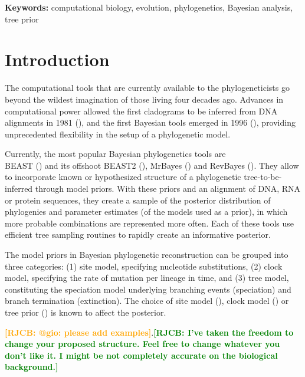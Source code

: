 \documentclass{article}
\newcommand*\richel[1]{\textcolor{orange}{\textbf{[RJCB: #1]}}}
\newcommand*\gio[1]{\textcolor{green}{\textbf{[RJCB: #1]}}}
\begin{document}
{\bf Keywords:} computational biology, evolution, phylogenetics, Bayesian analysis, tree prior

\section{Introduction}

The computational tools that are currently available 
to the phylogeneticists go beyond the wildest 
imagination of those living four decades ago.
Advances in computational power allowed the first cladograms to be inferred 
from DNA alignments in 1981 (\cite{felsenstein1981}), and  
the first Bayesian tools emerged in 1996 (\cite{rannala1996}),
providing unprecedented flexibility in the setup of a phylogenetic model.

Currently, the most popular Bayesian phylogenetics tools are \\ 
BEAST (\cite{beast}) and its offshoot BEAST2 (\cite{beast2}), 
MrBayes (\cite{mrbayes}) and RevBayes (\cite{revbayes}). 
They allow to incorporate known or hypothesized structure of a phylogenetic 
tree-to-be-inferred through model priors. 
With these priors and an alignment of DNA, RNA or protein sequences, 
they create a sample of the posterior distribution
of phylogenies and parameter estimates (of the models used as a prior), 
in which more probable combinations are represented more often.
Each of these tools use efficient tree sampling routines to rapidly create an 
informative posterior.

The model priors in Bayesian phylogenetic reconstruction 
can be grouped into three categories: (1) site model, specifying 
nucleotide substitutions, (2) clock model, specifying
the rate of mutation per lineage in time, and (3) tree model, 
constituting the speciation model underlying branching events (speciation) 
and branch termination (extinction).
The choice of site model (\cite{posada_and_buckley_2004}), 
clock model (\cite{baele_et_al_2012}) 
or tree prior (\cite{moller2018, yang_and_ranalla_2005}) is known to affect
the posterior.

\richel{@gio: please add examples}.\gio{I've taken the freedom to change your proposed structure. Feel free to change whatever you don't like it. I might be not completely accurate on the biological background.}
\end{document}
